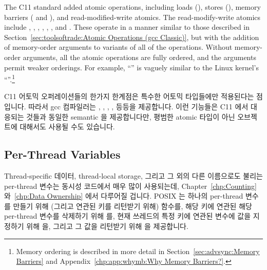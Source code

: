 The C11 standard added atomic operations,
including loads (),
stores (),
memory barriers ( and
), and read-modified-write atomics.
The read-modify-write atomics include
,
,
,
,
,
,
and
.
These operate in a manner similar to those described in
Section~\ref{sec:toolsoftrade:Atomic Operations (gcc Classic)},
but with the addition of memory-order arguments to 
variants of all of the operations.
Without memory-order arguments, all the atomic operations are
fully ordered, and the arguments permit weaker orderings.
For example, ``''
is vaguely similar to the Linux kernel's ``''.\footnote{
	Memory ordering is described in more detail in
	Section~\ref{sec:advsync:Memory Barriers} and
	Appendix~\ref{chp:app:whymb:Why Memory Barriers?}.}
\fi

C11 어토믹 오퍼레이션들의 한가지 한계점은 특수한 어토믹 타입들에만 적용된다는
점입니다.
따라서 gcc 컴파일러는
,
,
,
, 등등을 제공합니다.
이런 기능들은 C11 에서 대응되는 것들과 동일한 semantic 을 제공합니다만, 평범한
atomic 타입이 아닌 오브젝트에 대해서도 사용될 수도 있습니다.

\subsection{Per-Thread Variables}
\label{sec:toolsoftrade:Per-Thread Variables}

Thread-specific 데이터, thread-local storage, 그리고 그 외의 다른 이름으로도
불리는 per-thread 변수는 동시성 코드에서 매우 많이 사용되는데,
Chapter~\ref{chp:Counting} 와~\ref{chp:Data Ownership} 에서 다루어질 겁니다.
POSIX 는 하나의 per-thread 변수를 만들기 위해 (그리고 연관된 키를 리턴받기
위해)  함수를, 해당 키에 연관된 해당 per-thread 변수를
삭제하기 위해  를, 현재 쓰레드의 특정 키에 연관된
변수에 값을 지정하기 위해  을, 그리고 그 값을
리턴받기 위해  을 제공합니다.
\iffalse

